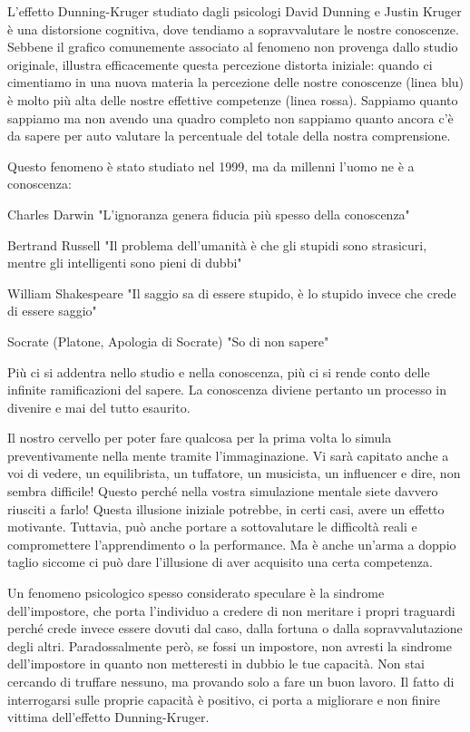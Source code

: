 \documentclass[12pt]{book} %
\begin{document}
L'effetto Dunning-Kruger studiato dagli psicologi David Dunning e Justin
Kruger è una distorsione cognitiva, dove tendiamo a
sopravvalutare le nostre conoscenze. Sebbene il grafico comunemente associato al fenomeno non provenga dallo studio originale, illustra efficacemente questa percezione distorta iniziale: quando ci cimentiamo in una nuova materia la percezione delle nostre conoscenze (linea blu) è molto più alta delle nostre effettive competenze (linea rossa). Sappiamo quanto sappiamo ma non avendo una quadro completo non sappiamo quanto ancora
c'è da sapere per auto valutare la percentuale del totale della nostra comprensione.

Questo fenomeno è stato studiato nel 1999, ma da millenni l'uomo ne è a conoscenza:

Charles Darwin "L'ignoranza genera fiducia più spesso della conoscenza"

Bertrand Russell "Il problema dell'umanità è che gli stupidi sono strasicuri,
mentre gli intelligenti sono pieni di dubbi"

William Shakespeare "Il saggio sa di essere stupido, è lo stupido invece che crede di essere
saggio"

Socrate (Platone, Apologia di Socrate) "So di non sapere"

Più ci si addentra nello studio e nella conoscenza, più ci si rende conto delle infinite ramificazioni del sapere. La
conoscenza diviene pertanto un processo in divenire e mai del tutto esaurito. 

Il nostro cervello per poter fare qualcosa per la prima volta lo simula preventivamente nella mente tramite
l'immaginazione. Vi sarà capitato anche a voi di vedere, un equilibrista, un tuffatore, un
musicista, un influencer e dire, non sembra difficile! Questo perché nella vostra simulazione mentale siete davvero
riusciti a farlo! Questa illusione iniziale potrebbe, in certi casi, avere un effetto motivante. Tuttavia, può anche portare a sottovalutare le difficoltà reali e compromettere l’apprendimento o la performance. Ma è anche
un'arma a doppio taglio siccome ci può dare l'illusione di aver acquisito una
certa competenza.

Un fenomeno psicologico spesso considerato speculare è la sindrome dell'impostore, che porta
l'individuo a credere di non meritare i propri traguardi perché crede invece essere dovuti dal
caso, dalla fortuna o dalla sopravvalutazione degli altri. Paradossalmente però, se fossi un impostore, non avresti la
sindrome dell'impostore in quanto non metteresti in dubbio le tue capacità. Non stai cercando di
truffare nessuno, ma provando solo a fare un buon lavoro. Il fatto di interrogarsi sulle proprie capacità è positivo,
ci porta a migliorare e non finire vittima dell'effetto Dunning-Kruger.
\end{document}
